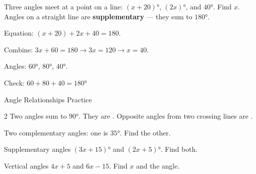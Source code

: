 \begin{stepExample}{Three angles meet at a point on a line: $(x + 20)°$, $(2x)°$, and $40°$. Find $x$.}
     Angles on a straight line are \textbf{supplementary} --- they sum to $180°$.

     Equation: $(x + 20) + 2x + 40 = 180$.

     Combine: $3x + 60 = 180 \to 3x = 120 \to x = 40$.\par
    Angles: $60°$, $80°$, $40°$.

     Check: $60 + 80 + 40 = 180°$ \checkmark
\end{stepExample}


\newpage
\begin{stepPractice}{Angle Relationships Practice}
    \resetProblems

    \begin{multicols}{2}
    \prob Two angles sum to $90°$. They are \answerBlank[2.5cm].
    \prob Opposite angles from two crossing lines are \answerBlank[2.5cm].
    \end{multicols}

    \prob Two complementary angles: one is $35°$. Find the other. \answerBlank[2cm]

    \prob Supplementary angles $(3x + 15)°$ and $(2x + 5)°$. Find both. \answerBlank[3cm]

    \prob Vertical angles $4x + 5$ and $6x - 15$. Find $x$ and the angle. \answerBlank[3cm]

\end{stepPractice}
